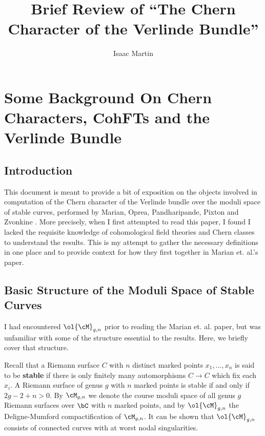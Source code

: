 \documentclass[raggedright, nofonts, notitlepage, openany, debug]{tufte-book}
\begin{document}
\newpage
\title{Brief Review of ``The Chern Character of the Verlinde Bundle''}
\author{Isaac Martin}
\maketitle
\chapter{Some Background On Chern Characters, CohFTs and the Verlinde Bundle}
\section{Introduction}
This document is meant to provide a bit of exposition on the objects involved in computation of the Chern character of the Verlinde bundle over the moduli space of stable curves, performed by Marian, Oprea, Pandharipande, Pixton and Zvonkine \cite{marian2016chern}. More precisely, when I first attempted to read this paper, I found I lacked the requisite knowledge of cohomological field theories and Chern classes to understand the results. This is my attempt to gather the necessary definitions in one place and to provide context for how they first together in Marian et. al.'s paper.

\section{Basic Structure of the Moduli Space of Stable Curves}
I had encountered $\ol{\cM}_{g,n}$ prior to reading the Marian et. al. paper, but was unfamiliar with some of the structure essential to the results. Here, we briefly cover that structure.

Recall that a Riemann surface $C$  with $n$ distinct marked points $x_1,...,x_n$ is said to be \textbf{stable} if there is only finitely many automorphisms $C\to C$ which fix each $x_i$. A Riemann surface of genus $g$ with $n$ marked points is stable if and only if $2g - 2 + n > 0$.  By $\cM_{g,n}$ we denote the course moduli space of all genus $g$ Riemann surfaces over $\bC$ with $n$ marked points, and by $\ol{\cM}_{g,n}$ the Deligne-Mumford compactification of $\cM_{g,n}$. It can be shown that $\ol{\cM}_{g,n}$ consists of connected curves with at worst nodal singularities. 
\end{document}
